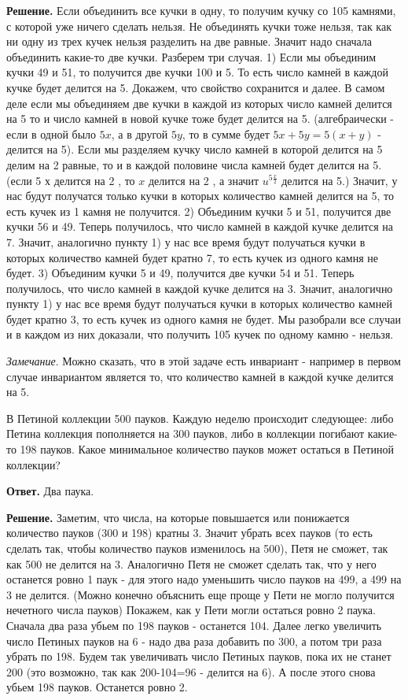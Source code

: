 \textbf{Решение.} Если объединить все кучки в одну, то получим кучку со 105 камнями, с которой уже ничего сделать нельзя. Не объединять кучки тоже нельзя, так как ни одну из трех кучек нельзя разделить на две равные. Значит надо сначала объединить какие-то две кучки. Разберем три случая.
1) Если мы объединим кучки 49 и 51, то получится две кучки 100 и 5. То есть число камней в каждой кучке будет делится на 5. Докажем, что свойство сохранится и далее.
В самом деле если мы объединяем две кучки в каждой из которых число камней делится на 5 то и число камней в новой кучке тоже будет делится на 5. (алгебраически - если в одной было $5 x$, а в другой $5 y$, то в сумме будет $5 x+5 y=5(x+y)$ - делится на 5). Если мы разделяем кучку число камней в которой делится на 5 делим на 2 равные, то и в каждой половине числа камней будет делится на 5. (если 5 х делится на 2 , то $x$ делится на 2 , а значит $u^{5 \frac{x}{2}}$ делится на 5.)
Значит, у нас будут получатся только кучки в которых количество камней делится на 5, то есть кучек из 1 камня не получится.
2) Объединим кучки 5 и 51, получится две кучки 56 и 49. Теперь получилось, что число камней в каждой кучке делится на 7. Значит, аналогично пункту 1) у нас все время будут получаться кучки в которых количество камней будет кратно 7, то есть кучек из одного камня не будет.
3) Объединим кучки 5 и 49, получится две кучки 54 и 51. Теперь получилось, что число камней в каждой кучке делится на 3. Значит, аналогично пункту 1) у нас все время будут получаться кучки в которых количество камней будет кратно 3, то есть кучек из одного камня не будет.
Мы разобрали все случаи и в каждом из них доказали, что получить 105 кучек по одному камню - нельзя.

\textit{Замечание}. Можно сказать, что в этой задаче есть инвариант - например в первом случае инвариантом является то, что количество камней в каждой кучке делится на 5.

В Петиной коллекции 500 пауков. Каждую неделю происходит следующее: либо Петина коллекция пополняется на 300 пауков, либо в коллекции погибают какие-то 198 пауков. Какое минимальное количество пауков может остаться в Петиной коллекции?

\textbf{Ответ.} Два паука.

\textbf{Решение.} Заметим, что числа, на которые повышается или понижается количество пауков
(300 и 198) кратны 3. Значит убрать всех пауков (то есть сделать так, чтобы количество пауков изменилось на 500), Петя не сможет, так как 500 не делится на 3. Аналогично Петя не сможет сделать так, что у него останется ровно 1 паук - для этого надо уменьшить число пауков на 499, а 499 на 3 не делится. (Можно конечно объяснить еще проще у Пети не могло получится нечетного числа пауков)
Покажем, как у Пети могли остаться ровно 2 паука. Сначала два раза убьем по 198 пауков - останется 104. Далее легко увеличить число Петиных пауков на 6 - надо два раза добавить по 300, а потом три раза убрать по 198. Будем так увеличивать число Петиных пауков, пока их не станет 200 (это возможно, так как 200-104=96 - делится на 6). А после этого снова убьем 198 пауков. Останется ровно 2.

